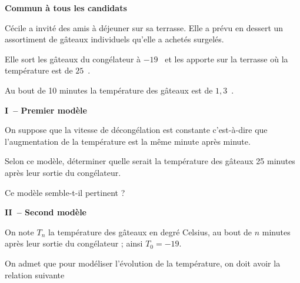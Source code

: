 
\textbf{Commun à tous les candidats}

\vspace{0.5cm}

Cécile a invité des amis à déjeuner sur sa terrasse. Elle a prévu en dessert 
un assortiment de gâteaux individuels qu'elle a achetés surgelés.

Elle sort les gâteaux du congélateur à $-19$~\textcelsius{} et les apporte sur la terrasse où la température est de  $25$~\textcelsius.

Au bout de 10 minutes la température des gâteaux est de $1,3$~\textcelsius.

\begin{center}
\textbf{I~-- Premier modèle}
\end{center}

On suppose que la vitesse de décongélation est constante c'est-à-dire que l'augmentation de la température est la même minute après minute.

Selon ce modèle, déterminer quelle serait la température des gâteaux 25 minutes après leur sortie du congélateur.

Ce modèle semble-t-il pertinent ? 

\medskip

\begin{center}
\textbf{II~-- Second modèle}
\end{center}
\medskip

On note $T_n$ la température des gâteaux  en degré Celsius, au bout de $n$ minutes après leur sortie du congélateur ; ainsi $T_0 = - 19$.

On admet que pour modéliser l'évolution de la température, on doit avoir la relation suivante 

